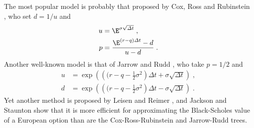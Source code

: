 The most popular model is probably that proposed by Cox, Ross and Rubinstein \cite{CRR},  who set $d=1/u$ and 
\begin{subequations}
\begin{align}
u &= \E^{\sigma\sqrt{\varDelta t}}\;,\label{crru}\\
p &= \frac{\E^{(r-q)\varDelta t}-d}{u-d}\;.\label{crrp}
\end{align}
\end{subequations}
Another well-known model is that of Jarrow and Rudd \cite{JR},  who take $p=1/2$ and
\begin{subequations}
\begin{align}
u &= \exp\left(\left((r-q-\frac{1}{2}\sigma^2\right)\varDelta t + \sigma\sqrt{\varDelta t}\right)\;,\label{jru}\\
d &= \exp\left(\left((r-q-\frac{1}{2}\sigma^2\right)\varDelta t - \sigma\sqrt{\varDelta t}\right)\;.\label{jrd}
\end{align}
\end{subequations}
Yet another method is proposed by 
 Leisen and Reimer \cite{LR},  and Jackson and Staunton \cite{JS}  show that it is more efficient for approximating the Black-Scholes value of a European option than are the Cox-Ross-Rubinstein and Jarrow-Rudd trees.

